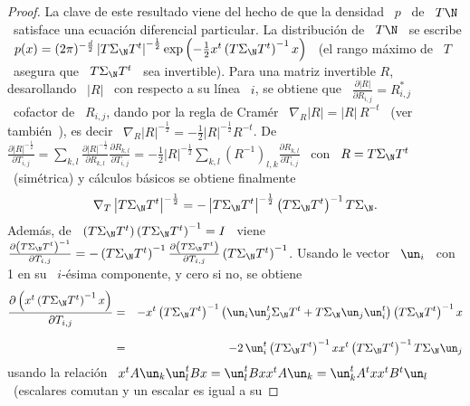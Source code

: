 \begin{proof}
  La clave de este resultado viene del hecho  de que la densidad \ $p$ \ de \ $T
  \N$ \ satisface una  ecuaci\'on diferencial particular.  La distribuci\'on
  de  \ $T  \N$  \ se  escribe \  $p(x)  = (2  \pi)^{-\frac{d}{2}} \left|  T
    \Sigma_\N  T^t  \right|^{-\frac12} \exp\left(  -  \frac12  x^t \left(  T
      \Sigma_\N T^t \right)^{-1} x \right)$ \  (el rango m\'aximo de \ $T$ \
  asegura  que \  $T  \Sigma_\N T^t$  \  sea invertible).   Para una  matriz
  invertible $R$,  desarollando \ $|R|$  \ con respecto  a su l\'inea \  $i$, se
  obtiene que  \ $\frac{\partial |R|}{\partial R_{i,j}} =  R_{i,j}^*$ \ cofactor
  de  \ $R_{i,j}$,  dando por  la regla  de Cram\'er  \ $\nabla_R  |R| =  |R| \,
  R^{-t}$ \  (ver tambi\'en~\cite[cap.~1~\&~9]{MagNeu99}), es  decir \ $\nabla_R
  |R|^{-\frac12}   =  -\frac12   |R|^{-\frac12}  R^{-t}$.    De  $\frac{\partial
    |R|^{-\frac12}}{\partial     T_{i,j}}     =    \sum_{k,l}     \frac{\partial
    |R|^{-\frac12}}{\partial R_{k,l}}  \frac{\partial R_{k,l}}{\partial T_{i,j}}
  =   -\frac12    |R|^{-\frac12}   \sum_{k,l}   \left(    R^{-1}   \right)_{l,k}
  \frac{\partial R_{k,l}}{\partial T_{i,j}}$ \ con \ $R = T \Sigma_\N T^t$ \
  (sim\'etrica) y c\'alculos b\'asicos se obtiene finalmente
  \[
  \nabla_T  \left|   T  \Sigma_\N  T^t  \right|^{-\frac12}  =   -  \left|  T
    \Sigma_\N T^t \right|^{-\frac12} \left( T \Sigma_\N T^t \right)^{-1}
  T \Sigma_\N.
  \]
  Adem\'as, de \ $\left( T  \Sigma_\N T^t \right) \left( T \Sigma_\N T^t
  \right)^{-1}  =  I$ \  viene  \  $\frac{\partial  \left( T  \Sigma_\N  T^t
    \right)^{-1}}{\partial T_{i,j}} = -  \left( T \Sigma_\N T^t \right)^{-1}
  \frac{\partial \left( T \Sigma_\N  T^t \right)}{\partial T_{i,j}} \left( T
    \Sigma_\N T^t \right)^{-1}$.  Usando le vector \ $\un_i$ \ con 1 en su \
  $i$-\'esima componente, y cero si no, se obtiene
  \begin{eqnarray*}
  \frac{\partial \left( x^t \left( T \Sigma_\N T^t \right)^{-1} x
  \right)}{\partial T_{i,j}} & = & - x^t \left( T \Sigma_\N T^t \right)^{-1}
  \left( \un_i \un_j^t \Sigma_\N T^t + T \Sigma_\N \un_j \un_i^t \right) \left( T
  \Sigma_\N T^t \right)^{-1} x\\[2.5mm]
  & = & - 2 \, \un_i^t \left( T \Sigma_\N T^t \right)^{-1} x x^t \left( T
  \Sigma_\N T^t \right)^{-1} T \Sigma_\N \un_j
  \end{eqnarray*}
  usando la relaci\'on  \ $x^t A \un_k \un_l^t B  x = \un_l^t B x  x^t A \un_k =
  \un_k^t A^t x x^t  B^t \un_l$ \ (escalares comutan y un  escalar es igual a su

\end{proof}
